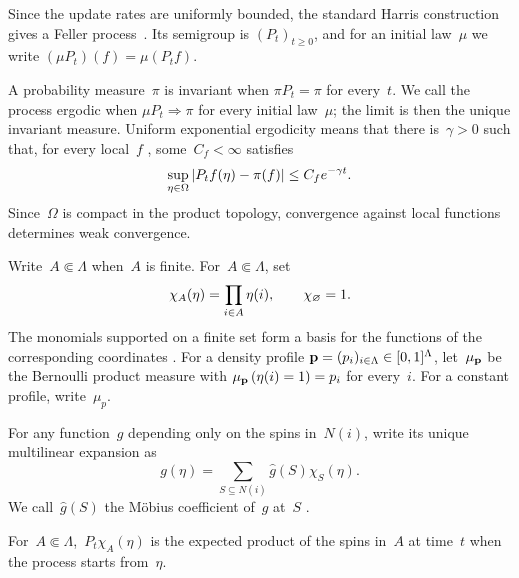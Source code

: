 Since the update rates are uniformly bounded, the standard Harris construction
gives a Feller process~\cite{Harris1978,Liggett1985}. Its semigroup is
$(P_t)_{t\geq0}$, and for an initial law~$\mu$ we write
$(\mu P_t)(f)=\mu(P_tf)$.


A probability measure~$\pi$ is invariant when
$\pi P_t=\pi$ for every~$t$. We call the process ergodic when
$\mu P_t\Rightarrow\pi$  for every initial law~$\mu$; the limit is then the
unique invariant measure. Uniform exponential ergodicity means that there
is~$\gamma>0$ such that, for every local~$f$ , some~$C_f<\infty$ satisfies
\begin{equation*}
\sup_{\eta\in\Omega}\left|P_tf(\eta)-\pi(f)\right|
\leq C_fe^{-\gamma t}.
\end{equation*}
 Since~$\Omega$ is compact in the product topology, convergence against local
functions determines weak convergence.

Write~$A\Subset\Lambda$ when~$A$ is finite. For~$A\Subset\Lambda$, set
\begin{equation*}
\chi_A(\eta)=\prod_{i\in A}\eta(i),
\qquad
\chi_\varnothing=1.
\end{equation*}
The monomials supported on a finite set form a basis for the functions of the
corresponding coordinates . For a density profile
$\mathbf{p}=(p_i)_{i\in\Lambda}\in[0,1]^\Lambda$, let~$\mu_{\mathbf{p}}$ be the
Bernoulli product measure with
$\mu_{\mathbf{p}}\left(\eta(i)=1\right)=p_i$ for every~$i$. For a constant profile,
write~$\mu_p$.

 For any function~$g$ depending only on the spins in~$N(i)$, write its unique
multilinear expansion as
\begin{equation}
\label{eq:rate-expansion}
g(\eta)
=
\sum_{S\subseteq N(i)}\widehat g(S)\chi_S(\eta).
\end{equation}
We call~$\widehat g(S)$ the M\"obius coefficient of~$g$ at~$S$ .



For~$A\Subset\Lambda$,~$P_t\chi_A(\eta)$ is the expected product of the spins
in~$A$ at time~$t$ when the process starts from~$\eta$.


